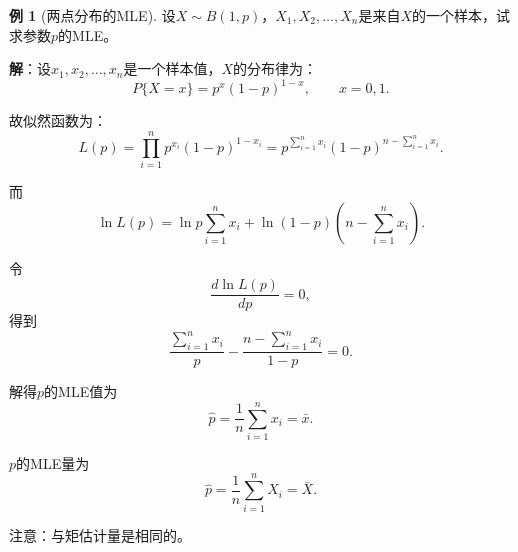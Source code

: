 \documentclass[11pt,a4paper]{report}
\theoremstyle{definition}
\newtheorem{example}{例}[chapter]
\begin{document}
\begin{example}[两点分布的MLE]
设$X\sim B(1,p)$，$X_{1},X_{2},\ldots,X_{n}$是来自$X$的一个样本，试求参数$p$的MLE。

\textbf{解}：设$x_{1},x_{2},\ldots,x_{n}$是一个样本值，$X$的分布律为：
\[
P\{X=x\}=p^{x}(1-p)^{1-x},\qquad x=0,1.
\]

故似然函数为：
\[
L(p)=\prod_{i=1}^{n}p^{x_{i}}(1-p)^{1-x_{i}}=p^{\sum_{i=1}^{n}x_{i}}(1-p)^{n-\sum_{i=1}^{n}x_{i}}.
\]

而
\[
\ln L(p)=\ln p\sum_{i=1}^{n}x_{i}+\ln(1-p)\left(n-\sum_{i=1}^{n}x_{i}\right).
\]

令
\[
\frac{d\ln L(p)}{dp}=0,
\]
得到
\[
\frac{\sum_{i=1}^{n}x_{i}}{p}-\frac{n-\sum_{i=1}^{n}x_{i}}{1-p}=0.
\]

解得$p$的MLE值为
\[
\hat{p}=\frac{1}{n}\sum_{i=1}^{n}x_{i}=\bar{x}.
\]

$p$的MLE量为
\[
\hat{p}=\frac{1}{n}\sum_{i=1}^{n}X_{i}=\bar{X}.
\]

注意：与矩估计量是相同的。
\end{example}
\end{document}
